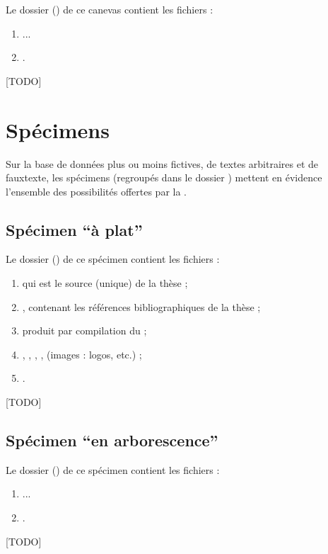 Le dossier () de ce canevas contient les fichiers :
\begin{enumerate}
\item ...
\item {}.
\end{enumerate}

[TODO]

\section{Spécimens}
\label{sec-specimens}

Sur la base de données plus ou moins fictives, de textes arbitraires et de
\gls{fauxtexte}, les spécimens (regroupés dans le dossier )
mettent en évidence l'ensemble des possibilités offertes par la \yatcl{}.

\subsection{Spécimen \enquote{à plat}}
\label{sec-specimen-a-plat}

Le dossier () de ce spécimen contient les fichiers :
\begin{enumerate}
\item {} qui est le source  (unique) de la thèse ;
\item {}, contenant les références bibliographiques de
  la thèse ;
\item {} produit par compilation du  ;
\item {}, , , ,
   (images : logos, etc.) ;
\item {}.
\end{enumerate}

[TODO]

\subsection{Spécimen \enquote{en arborescence}}
\label{sec-specimen-arborescence}

Le dossier () de ce spécimen contient les
fichiers :
\begin{enumerate}
\item ...
\item {}.
\end{enumerate}

[TODO]

%
\iffalse
\fi
